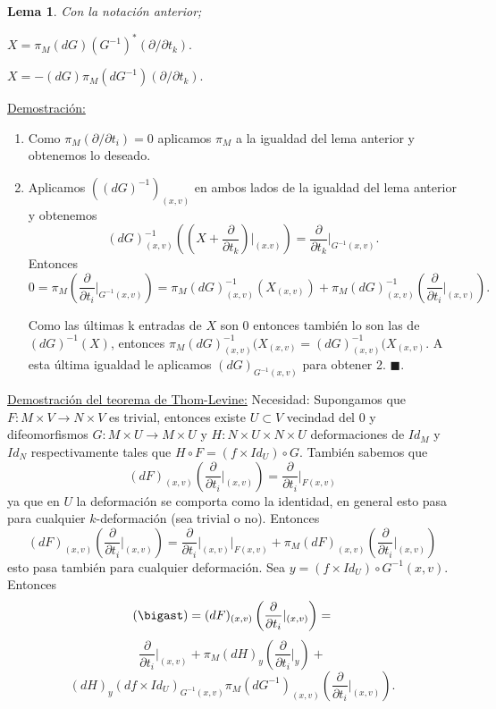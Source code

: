 \documentclass{report}
\newtheorem{lem}[theorem]{Lema}
\theoremstyle{definition}
\begin{document}
\begin{lem}
Con la notaci\'on anterior;
\item $X = \pi_M (dG) (G^{-1})^\ast  (\partial /\partial t_k) .$
\item $X = - (dG) \pi_M (dG^{-1})(\partial / \partial t_k) .$
\end{lem}

\underline{Demostraci\'on:} \begin{enumerate}
\item Como $\pi_M (\partial / \partial t_i) = 0$ aplicamos $\pi_M$ a la igualdad del lema anterior y obtenemos lo deseado.

\item  Aplicamos $((dG)^{-1})_{(x,v)}$ en ambos lados de la igualdad del lema anterior y obtenemos $$(dG)^{-1}_{(x,v)} \left( \left( X + \frac{\partial}{\partial t_k} \right) \vert_{(x.v)} \right) = \frac{\partial}{\partial t_k} \vert_{G^{-1} (x,v)} .$$
Entonces $$0 = \pi_M \left( \frac{\partial}{\partial t_i} \vert_{G^{-1} (x,v)} \right) = \pi_M (dG)^{-1}_{(x,v)} (X_{(x,v)}) + \pi_M (dG)^{-1}_{(x,v)} \left( \frac{\partial}{\partial t_i} \vert_{(x,v)} \right) . $$

Como las \'ultimas k entradas de $X$ son $0$ entonces tambi\'en lo son las de $(dG)^{-1} (X)$, entonces $\pi_M (dG)^{-1}_{(x,v)} (X_{(x,v)} = (dG)^{-1}_{(x,v)} (X_{(x,v)}$. A esta \'ultima igualdad le aplicamos $(dG)_{G^{-1} (x,v)}$ para obtener 2. $\blacksquare$.


\end{enumerate}

\underline{Demostraci\'on del teorema de Thom-Levine:} Necesidad: Supongamos que $F: M \times V \to N \times V$ es trivial, entonces existe $U \subset V$ vecindad del $0$ y difeomorfismos $G: M \times U \to M \times U$ y $H: N \times U \times N \times U$ deformaciones de $Id_M$ y $Id_N$ respectivamente tales que $ H \circ F = (f \times Id_U) \circ G$. Tambi\'en sabemos que $$(dF)_{(x,v)} \left( \frac{\partial}{\partial t_i} \vert_{(x,v)} \right) = \frac{\partial}{\partial t_i} \vert_{F(x,v)}$$
ya que en $U$ la deformaci\'on se comporta como la identidad, en general esto pasa para cualquier $k$-deformaci\'on (sea trivial o no). Entonces $$(dF)_{(x,v)} \left( \frac{\partial}{\partial t_i} \vert_{(x,v)} \right) = \frac{\partial}{\partial t_i} \vert_{(x,v)} \vert_{F(x,v)} + \pi_M (dF)_{(x,v)} \left( \frac{\partial}{\partial t_i} \vert_{(x,v)} \right)$$
esto pasa tambi\'en para cualquier deformaci\'on. Sea $y= (f \times Id_U) \circ G^{-1} (x,v)$. Entonces $$ (\bigast) =(dF)_{(x,v)} \left( \frac{\partial}{\partial t_i} \vert_{(x,v)} \right)  =$$ $$ \frac{\partial}{\partial t_i} \vert_{(x,v)} + \pi_M (dH)_y \left( \frac{\partial}{\partial t_i} \vert_y \right) +$$ $$ (dH)_y (df \times Id_U)_{G^{-1} (x,v)} \pi_M (dG^{-1})_{(x,v)} \left( \frac{\partial}{\partial t_i} \vert_{(x,v)} \right) .$$
\end{document}
